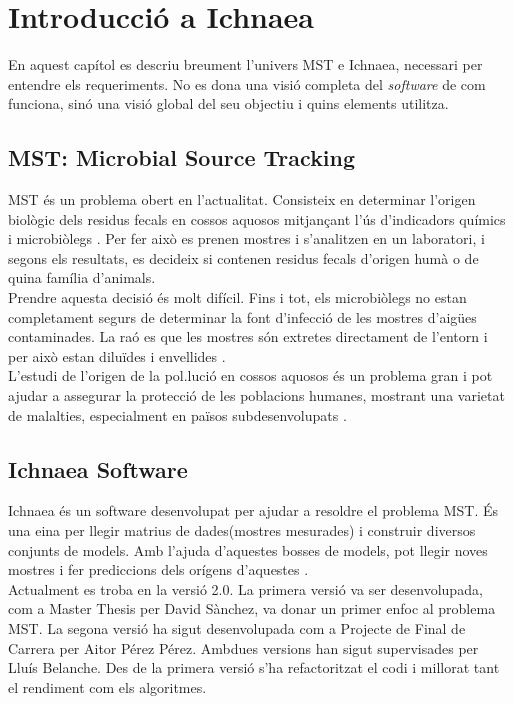 \chapter{Introducció a Ichnaea}
\label{cha:background}
En aquest cap\'{i}tol es descriu breument l'univers MST e Ichnaea, necessari per entendre els requeriments. No es dona una visi\'{o} completa del \textit{software} de com funciona, sinó una visi\'{o} global del seu objectiu i quins elements utilitza. 

\section{MST: Microbial Source Tracking}
\label{sec:mst}
MST \'{e}s un problema obert en l'actualitat. Consisteix en determinar l'origen biol\`{o}gic dels residus fecals en cossos aquosos mitjan\c{c}ant l'\'{u}s d'indicadors químics i microbiòlegs \cite{paper}. Per fer això es prenen mostres i s'analitzen en un laboratori, i segons els resultats, es decideix si contenen residus fecals d'origen humà o de quina família d'animals.\cite{pfc}\\

Prendre aquesta decisió \'{e}s molt difícil. Fins i tot, els microbiòlegs no estan completament segurs de determinar la font d'infecció de les mostres d'aigües contaminades. La raó es que les mostres s\'{o}n extretes directament de l'entorn i per això estan diluïdes i envellides \cite{pfc}.\\

L'estudi de l'origen de la pol.luci\'{o} en cossos aquosos \'{e}s un problema gran i pot ajudar a assegurar la protecció de les poblacions humanes, mostrant una varietat de malalties, especialment en països subdesenvolupats \cite{pfc}.\\

\section{Ichnaea Software}
Ichnaea \'{e}s un software desenvolupat per ajudar a resoldre el problema MST. \'{E}s una eina per llegir matrius de dades(mostres mesurades) i construir diversos conjunts de models. Amb l'ajuda d'aquestes bosses de models, pot llegir noves mostres i fer prediccions dels orígens d'aquestes \cite{pfc}.\\
 
Actualment es troba en la versi\'{o} 2.0. La primera versi\'{o} va ser desenvolupada, com a Master Thesis per David Sànchez, va donar un primer enfoc al problema MST. La segona versi\'{o} ha sigut desenvolupada com a Projecte de Final de Carrera per Aitor P\'{e}rez P\'{e}rez. Ambdues versions han sigut supervisades per Llu\'{i}s Belanche. Des de la primera versi\'{o} s'ha refactoritzat el codi i millorat tant el rendiment com els algoritmes.\\


